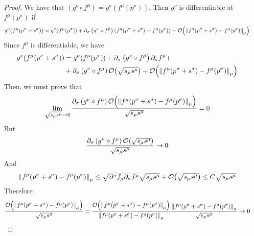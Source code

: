 \documentclass[../complete.tex]{subfiles}
\begin{document}
\begin{proof}
	We have that $\left(g^\nu\circ f^\mu\right)=g^\nu(f^\mu(p^\sigma))$. Then $g^\nu$ is differentiable at $f^\mu(p^\sigma)$ if
	\begin{equation*}
			g^\nu(f^\mu(p^\sigma+s^\sigma))=g^\nu(f^\mu(p^\sigma))+\del_\sigma\left( g^\nu\circ f^{\tilde{\mu}}\right)\left( f^\mu(p^\sigma+s^\sigma)-f^\mu(p^\sigma) \right)+\order{\norm{f^\mu(p^\sigma+s^\sigma)-f^\mu(p^\sigma)}_\mu}
	\end{equation*}
	Since $f^\mu$ is differentiable, we have
	\begin{equation*}%
		\begin{aligned}
			g^\nu(f^\mu(p^\sigma+s^\sigma))&=g^\nu(f^\mu(p^\sigma))+\del_\sigma\left(g^\nu\circ f^{\tilde{\mu}}\right)\del_\sigma f^\mu+\\
			&+\del_\sigma\left(g^\nu\circ f^\mu\right)\order{\sqrt{s_\mu s^\mu}}+\order{\norm{f^\mu(p^\sigma+s^\sigma)-f^\mu(p^\sigma)}_\mu}
		\end{aligned}
	\end{equation*}
	Then, we must prove that
	\begin{equation*}
		\lim_{\sqrt{s_\mu s^\mu}\to0}\frac{\del_\sigma\left(g^\nu\circ f^\mu\right)\order{\norm{f^\mu(p^\sigma+s^\sigma)-f^\mu(p^\sigma)}_\mu}}{\sqrt{s_\mu s^\mu}}=0
	\end{equation*}
	But
	\begin{equation*}
		\frac{\del_\sigma\left( g^\nu\circ f^\mu \right)\order{\sqrt{s_\mu s^\mu}}}{\sqrt{s_\mu s^\mu}}\to0	\end{equation*}
	And
	\begin{equation*}
		\norm{f^\mu(p^\sigma+s^\sigma)-f^\mu(p^\sigma)}_\mu\le\sqrt{\del^\sigma f_\mu\del_\sigma f^\mu}\sqrt{s_\mu s^\mu}+\order{\sqrt{s_\mu s^\mu}}\le C\sqrt{s_\mu s^\mu}
	\end{equation*}
	Therefore
	\begin{equation*}
		\frac{\order{\norm{f^\mu(p^\sigma+s^\sigma)-f^\mu(p^\sigma)}_\mu}}{\sqrt{s_\mu s^\mu}}=\frac{\order{\norm{f^\mu(p^\sigma+s^\sigma)-f^\mu(p^\sigma)}_\mu}}{\norm{f^\mu(p^\sigma+s^\sigma)-f^\mu(p^\sigma)}_\mu}\frac{\norm{f^\mu(p^\sigma+s^\sigma)-f^\mu(p^\sigma)}_\mu}{\sqrt{s_\mu s^\mu}}\to0
	\end{equation*}
\end{proof}
\end{document}
